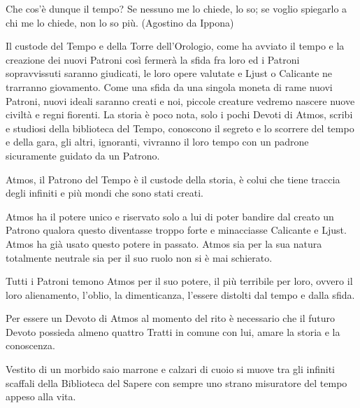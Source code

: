 \begin{multicols}{2}
\begin{changemargin}{0.3cm}{0.3cm}\begin{enfasi}{
Che cos'è dunque il tempo? Se nessuno me lo chiede, lo so; se voglio spiegarlo a chi me lo chiede, non lo so più. (Agostino da Ippona)
}\end{enfasi}\end{changemargin}\medskip

Il custode del Tempo e della Torre dell'Orologio, come ha avviato il tempo e la creazione dei nuovi Patroni così fermerà la sfida fra loro ed i Patroni sopravvissuti saranno giudicati, le loro opere valutate e Ljust o Calicante ne trarranno giovamento. Come una sfida da una singola moneta di rame nuovi Patroni, nuovi ideali saranno creati e noi, piccole creature vedremo nascere nuove civiltà e regni fiorenti. La storia è poco nota, solo i pochi Devoti di Atmos, scribi e studiosi della biblioteca del Tempo, conoscono il segreto e lo scorrere del tempo e della gara, gli altri, ignoranti, vivranno il loro tempo con un padrone sicuramente guidato da un Patrono.

Atmos, il Patrono del Tempo è il custode della storia, è colui che tiene traccia degli infiniti e più mondi che sono stati creati.

Atmos ha il potere unico e riservato solo a lui di poter bandire dal creato un Patrono qualora questo diventasse troppo forte e minacciasse Calicante e Ljust. Atmos ha già usato questo potere in passato. Atmos sia per la sua natura totalmente neutrale sia per il suo ruolo non si è mai schierato.

Tutti i Patroni temono Atmos per il suo potere, il più terribile per loro, ovvero il loro alienamento, l'oblio, la dimenticanza, l'essere distolti dal tempo e dalla sfida.

Per essere un Devoto di Atmos al momento del rito è necessario che il futuro Devoto possieda almeno quattro Tratti in comune con lui, amare la storia e la conoscenza.

Vestito di un morbido saio marrone e calzari di cuoio si muove tra gli infiniti scaffali della Biblioteca del Sapere con sempre uno strano misuratore del tempo appeso alla vita.


\end{multicols}
